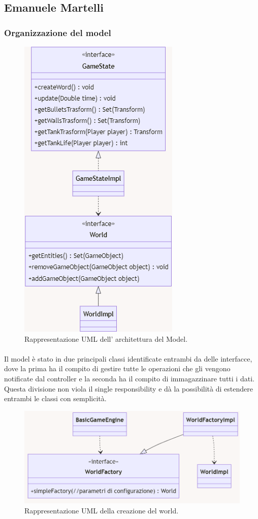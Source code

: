 \documentclass[a4paper,12pt]{report}
\begin{document}
\subsection*{Emanuele Martelli}
%
\subsubsection*{Organizzazione del model}
%
\begin{figure}[H]
	\centering{}
	\includegraphics[scale=0.9]{img/gameState.png}
	\caption{Rappresentazione UML dell' architettura del Model.}
	\end{figure}
%
\paragraph{} Il model è stato in due principali classi identificate entrambi da delle interfacce, dove la prima ha il compito di gestire tutte le operazioni che gli vengono notificate dal controller e la seconda ha il compito di immagazzinare tutti i dati. Questa divisione non viola il single responsibility e dà la possibilità di estendere entrambi le classi con semplicità.
%
\begin{figure}[H]
	\centering{}
	\includegraphics[scale=0.60]{img/worldFactory.png}
	\caption{Rappresentazione UML della creazione del world.}
	\end{figure}
%
\end{document}
